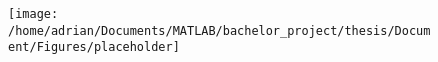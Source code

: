 \begin{figure}
	\centering
	\texttt{[image: /home/adrian/Documents/MATLAB/bachelor\_project/thesis/Document/Figures/placeholder]}
	\caption{}
	\label{fig:LightFieldParametrization}
\end{figure}


%	
%	
%		
%	
%		
%		
%	
